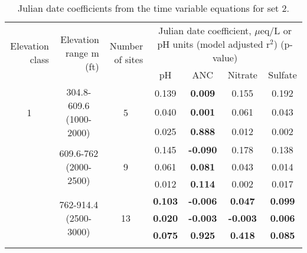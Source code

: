 \begin{table}[htbp]
  \centering
  \caption{Julian date coefficients from the time variable equations for set 2.}
    \begin{tabular}{rrrcccc}
    \toprule
    \multirow{3}[4]{2cm}{Elevation class} & \multirow{3}[4]{2.5cm}{Elevation range m (ft)} & \multirow{3}[4]{2cm}{Number of sites} & \multicolumn{4}{c}{\multirow{2}[2]{7cm}{Julian date coefficient, $\mu$eq/L or pH units (model adjusted r$^2$) (p-value)}} \\ 
          &       &       & \multicolumn{4}{c}{}\bigstrut\\\cline{4-7}\noalign{\smallskip}
          &       &       & pH    & ANC   & Nitrate & Sulfate \\
\midrule
    \multicolumn{1}{c}{\multirow{3}[2]{*}{1}} & \multicolumn{1}{c}{\multirow{3}[2]{2.5cm}{304.8-609.6 (1000-2000)}} & \multicolumn{1}{c}{\multirow{3}[2]{*}{5}} & 0.139  & \textbf{0.009 } & 0.155  & 0.192  \\
    \multicolumn{1}{c}{} & \multicolumn{1}{c}{} & \multicolumn{1}{c}{} & 0.040  & \textbf{0.001 } & 0.061  & 0.043  \\
    \multicolumn{1}{c}{} & \multicolumn{1}{c}{} & \multicolumn{1}{c}{} & 0.025  & \textbf{0.888 } & 0.012  & 0.002 \bigstrut\\\cline{4-7}\noalign{\smallskip}
    \multicolumn{1}{c}{\multirow{3}[2]{*}{2}} & \multicolumn{1}{c}{\multirow{3}[2]{2.5cm}{609.6-762 (2000-2500)}} & \multicolumn{1}{c}{\multirow{3}[2]{*}{9}} & 0.145  & \textbf{-0.090 } & 0.178  & 0.138  \\
    \multicolumn{1}{c}{} & \multicolumn{1}{c}{} & \multicolumn{1}{c}{} & 0.061  & \textbf{0.081 } & 0.043  & 0.014  \\
    \multicolumn{1}{c}{} & \multicolumn{1}{c}{} & \multicolumn{1}{c}{} & 0.012  & \textbf{0.114 } & 0.002  & 0.017 \bigstrut\\\cline{4-7}\noalign{\smallskip}
    \multicolumn{1}{c}{\multirow{3}[2]{*}{3}} & \multicolumn{1}{c}{\multirow{3}[2]{2.5cm}{762-914.4 (2500-3000)}} & \multicolumn{1}{c}{\multirow{3}[2]{*}{13}} & \textbf{0.103 } & \textbf{-0.006 } & \textbf{0.047 } & \textbf{0.099 } \\
    \multicolumn{1}{c}{} & \multicolumn{1}{c}{} & \multicolumn{1}{c}{} & \textbf{0.020 } & \textbf{-0.003 } & \textbf{-0.003 } & \textbf{0.006 } \\
    \multicolumn{1}{c}{} & \multicolumn{1}{c}{} & \multicolumn{1}{c}{} & \textbf{0.075 } & \textbf{0.925 } & \textbf{0.418 } & \textbf{0.085 } \bigstrut\\\cline{4-7}\noalign{\smallskip}

\end{tabular}
\end{table}
